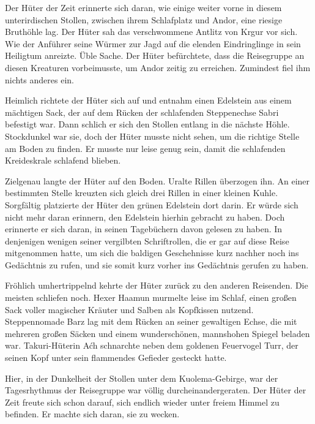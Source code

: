 Der Hüter der Zeit erinnerte sich daran, wie einige weiter vorne in diesem unterirdischen Stollen, zwischen ihrem Schlafplatz und Andor, eine riesige Bruthöhle lag. Der Hüter sah das verschwommene Antlitz von Krgur vor sich. Wie der Anführer seine Würmer zur Jagd auf die elenden Eindringlinge in sein Heiligtum anreizte. Üble Sache. Der Hüter befürchtete, dass die Reisegruppe an diesen Kreaturen vorbeimusste, um Andor zeitig zu erreichen. Zumindest fiel ihm nichts anderes ein.

Heimlich richtete der Hüter sich auf und entnahm einen Edelstein aus einem mächtigen Sack, der auf dem Rücken der schlafenden Steppenechse Sabri befestigt war. Dann schlich er sich den Stollen entlang in die nächste Höhle. Stockdunkel war sie, doch der Hüter musste nicht sehen, um die richtige Stelle am Boden zu finden. Er musste nur leise genug sein, damit die schlafenden Kreideskrale schlafend blieben.

Zielgenau langte der Hüter auf den Boden. Uralte Rillen überzogen ihn. An einer bestimmten Stelle kreuzten sich gleich drei Rillen in einer kleinen Kuhle. Sorgfältig platzierte der Hüter den grünen Edelstein dort darin. Er würde sich nicht mehr daran erinnern, den Edelstein hierhin gebracht zu haben. Doch erinnerte er sich daran, in seinen Tagebüchern davon gelesen zu haben. In denjenigen wenigen seiner vergilbten Schriftrollen, die er gar auf diese Reise mitgenommen hatte, um sich die baldigen Geschehnisse kurz nachher noch ins Gedächtnis zu rufen, und sie somit kurz vorher ins Gedächtnis gerufen zu haben.

Fröhlich umhertrippelnd kehrte der Hüter zurück zu den anderen Reisenden. Die meisten schliefen noch. Hexer Haamun murmelte leise im Schlaf, einen großen Sack voller magischer Kräuter und Salben als Kopfkissen nutzend. Steppennomade Barz lag mit dem Rücken an seiner gewaltigen Echse, die mit mehreren großen Säcken und einem wunderschönen, mannshohen Spiegel beladen war. Takuri-Hüterin Aćh schnarchte neben dem goldenen Feuervogel Turr, der seinen Kopf unter sein flammendes Gefieder gesteckt hatte.

Hier, in der Dunkelheit der Stollen unter dem Kuolema-Gebirge, war der Tagesrhythmus der Reisegruppe war völlig durcheinandergeraten. Der Hüter der Zeit freute sich schon darauf, sich endlich wieder unter freiem Himmel zu befinden. Er machte sich daran, sie zu wecken.











